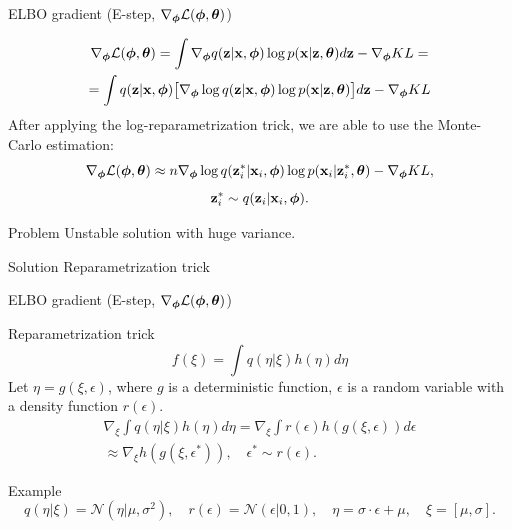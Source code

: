 \begin{frame}{ELBO gradient (E-step, $\nabla_{\boldsymbol{\phi}} \mathcal{L}(\boldsymbol{\phi}, \boldsymbol{\theta})$)}

\begin{multline*}
	\nabla_{\boldsymbol{\phi}} \mathcal{L} (\boldsymbol{\phi}, \boldsymbol{\theta}) = \int \nabla_{\boldsymbol{\phi}} q(\mathbf{z}| \mathbf{x}, \boldsymbol{\phi}) \log p(\mathbf{x} |\mathbf{z}, \boldsymbol{\theta}) d\mathbf{z}  - \nabla_{\boldsymbol{\phi}} KL = \\ 
	=  \int q(\mathbf{z}| \mathbf{x}, \boldsymbol{\phi}) \bigl[  \nabla_{\boldsymbol{\phi}} \log q(\mathbf{z}| \mathbf{x}, \boldsymbol{\phi}) \log p(\mathbf{x} |\mathbf{z}, \boldsymbol{\theta}) \bigr] d\mathbf{z} - \nabla_{\boldsymbol{\phi}} KL
\end{multline*}
After applying the log-reparametrization trick, we are able to use the Monte-Carlo estimation:
\[
\nabla_{\boldsymbol{\phi}} \mathcal{L} (\boldsymbol{\phi}, \boldsymbol{\theta}) \approx n \nabla_{\boldsymbol{\phi}} \log q(\mathbf{z}_i^*| \mathbf{x}_i, \boldsymbol{\phi}) \log p(\mathbf{x}_i |\mathbf{z}_i^*, \boldsymbol{\theta}) - \nabla_{\boldsymbol{\phi}} KL,
\]
\[
\mathbf{z}_i^* \sim q(\mathbf{z}_i| \mathbf{x}_i, \boldsymbol{\phi}).
\]
\vspace{-0.2cm}
\begin{block}{Problem} 
	Unstable solution with huge variance.
\end{block}
\begin{block}{Solution}
	Reparametrization trick
\end{block}
\end{frame}
\begin{frame}{ELBO gradient (E-step, $\nabla_{\boldsymbol{\phi}} \mathcal{L}(\boldsymbol{\phi}, \boldsymbol{\theta})$)}
	\begin{block}{Reparametrization trick}
		\vspace{-0.3cm}
		\[
		f(\xi) = \int q(\eta|\xi) h(\eta) d\eta
		\]
		Let $\eta = g(\xi, \epsilon)$, where $g$ is a deterministic function, $\epsilon$ is a random variable with a density function $r(\epsilon)$.
		\begin{multline*}
			\nabla_\xi \int q(\eta|\xi) h(\eta) d\eta = \nabla_\xi \int r(\epsilon) h(g(\xi, \epsilon)) d \epsilon \\
			\approx \nabla_\xi h(g(\xi, \epsilon^*)), \quad \epsilon^* \sim r(\epsilon).
		\end{multline*}
	\end{block}
	\vspace{-0.1cm}
	\begin{block}{Example}
		\vspace{-0.3cm}
		\[
		q(\eta|\xi) = \mathcal{N}(\eta| \mu, \sigma^2), \quad r(\epsilon) = \mathcal{N}(\epsilon|0, 1), \quad \eta = \sigma \cdot \epsilon + \mu, \quad \xi = [\mu, \sigma].
		\]
	\end{block}
\end{frame}
